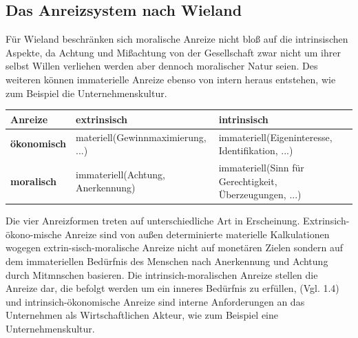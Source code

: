 \documentclass[12pt]{article}
\begin{document}
\subsection{Das Anreizsystem nach Wieland}
Für Wieland beschränken sich moralische Anreize nicht bloß auf die intrinsischen Aspekte, da Achtung und Mißachtung von der Gesellschaft zwar nicht um ihrer selbst Willen verliehen werden aber dennoch moralischer Natur seien. Des weiteren können immaterielle Anreize ebenso von intern heraus entstehen, wie zum Beispiel die Unternehmenskultur.
\begin{center}
\begin{tabular}{|p{3cm}|p{5cm}|p{5cm}|}
\hline
Anreize & \textbf{extrinsisch} & \textbf{intrinsisch}\\\hline
\textbf{ökonomisch} & materiell\newline(Gewinnmaximierung, ...) & immateriell\newline (Eigeninteresse, Identifikation, ...)\\\hline
\textbf{moralisch} & immateriell\newline (Achtung, Anerkennung) & immateriell\newline(Sinn für Gerechtigkeit, Überzeugungen, ...)\\\hline
\end{tabular}
\end{center}
Die vier Anreizformen treten auf unterschiedliche Art in Erscheinung. Extrinsich-ökono-mische Anreize sind von außen determinierte materielle Kalkulationen wogegen extrin-sisch-moralische Anreize nicht auf monetären Zielen sondern auf dem immateriellen Bedürfnis des Menschen nach Anerkennung und Achtung durch Mitmnschen basieren. Die intrinsich-moralischen Anreize stellen die Anreize dar, die befolgt werden um ein inneres Bedürfnis zu erfüllen, (Vgl. 1.4) und intrinsich-ökonomische Anreize sind interne Anforderungen an das Unternehmen als Wirtschaftlichen Akteur, wie zum Beispiel eine Unternehmenskultur.
\end{document}
